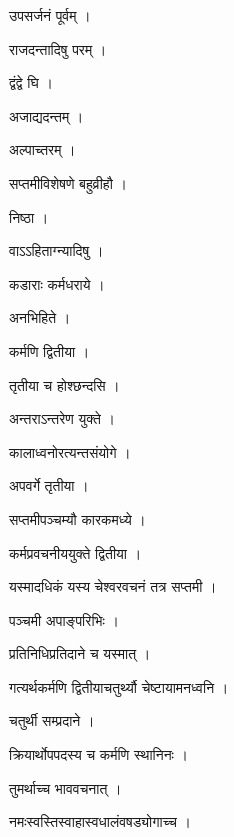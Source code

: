 \documentclass[10pt, openany]{book}
\begin{document}
\noindent उपसर्जनं पूर्वम् ।

\noindent राजदन्तादिषु परम् ।

\noindent द्वंद्वे घि ।

\noindent अजाद्यदन्तम् ।

\noindent अल्पाच्तरम् ।

\noindent सप्तमीविशेषणे बहुव्रीहौ ।

\noindent निष्ठा ।

\noindent वाऽऽहिताग्न्यादिषु ।

\noindent कडाराः कर्मधराये ।

\noindent अनभिहिते ।

\noindent कर्मणि द्वितीया ।

\noindent तृतीया च होश्छन्दसि ।

\noindent अन्तराऽन्तरेण युक्ते ।

\noindent कालाध्वनोरत्यन्तसंयोगे ।

\noindent अपवर्गे तृतीया ।

\noindent सप्तमीपञ्चम्यौ कारकमध्ये ।

\noindent कर्मप्रवचनीययुक्ते द्वितीया ।

\noindent यस्मादधिकं यस्य चेश्वरवचनं तत्र सप्तमी ।

\noindent पञ्चमी अपाङ्परिभिः ।

\noindent प्रतिनिधिप्रतिदाने च यस्मात् ।

\noindent गत्यर्थकर्मणि द्वितीयाचतुर्थ्यौ चेष्टायामनध्वनि ।

\noindent चतुर्थी सम्प्रदाने ।

\noindent क्रियार्थोपपदस्य च कर्मणि स्थानिनः ।

\noindent तुमर्थाच्च भाववचनात् ।

\noindent नमःस्वस्तिस्वाहास्वधालंवषड्योगाच्च ।
\end{document}
